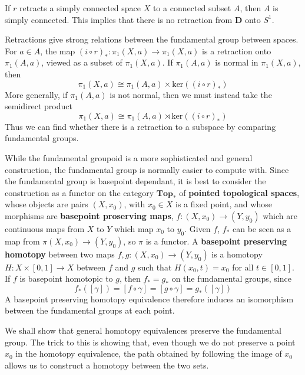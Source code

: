 \begin{example}
    If $r$ retracts a simply connected space $X$ to a connected subset $A$, then $A$ is simply connected. This implies that there is no retraction from $\mathbf{D}$ onto $S^1$.
\end{example}

Retractions give strong relations between the fundamental group between spaces. For $a \in A$, the map $(i \circ r)_*: \pi_1(X,a) \to \pi_1(X,a)$ is a retraction onto $\pi_1(A,a)$, viewed as a subset of $\pi_1(X,a)$. If $\pi_1(A,a)$ is normal in $\pi_1(X,a)$, then
%
\[ \pi_1(X,a) \cong \pi_1(A,a) \times \text{ker}((i \circ r)_*) \]
%
More generally, if $\pi_1(A,a)$ is not normal, then we must instead take the semidirect product
%
\[ \pi_1(X,a) \cong \pi_1(A,a) \rtimes \text{ker}((i \circ r)_*) \]
%
Thus we can find whether there is a retraction to a subspace by comparing fundamental groups.

While the fundamental groupoid is a more sophisticated and general construction, the fundamental group is normally easier to compute with. Since the fundamental group is basepoint dependant, it is best to consider the construction as a functor on the category $\textbf{Top}_*$ of {\bf pointed topological spaces}, whose objects are pairs $(X,x_0)$, with $x_0 \in X$ is a fixed point, and whose morphisms are {\bf basepoint proserving maps}, $f: (X,x_0) \to (Y,y_0)$ which are continuous maps from $X$ to $Y$ which map $x_0$ to $y_0$. Given $f$, $f_*$ can be seen as a map from $\pi(X,x_0) \to (Y,y_0)$, so $\pi$ is a functor. A {\bf basepoint preserving homotopy} between two maps $f,g: (X,x_0) \to (Y,y_0)$ is a homotopy $H: X \times [0,1] \to X$ between $f$ and $g$ such that $H(x_0, t) = x_0$ for all $t \in [0,1]$. If $f$ is basepoint homotopic to $g$, then $f_* = g_*$ on the fundamental groups, since
%
\[ f_*([\gamma]) = [f \circ \gamma] = [g \circ \gamma] = g_*([\gamma]) \]
%
A basepoint preserving homotopy equivalence therefore induces an isomorphism between the fundamental groups at each point.

We shall show that general homotopy equivalences preserve the fundamental group. The trick to this is showing that, even though we do not preserve a point $x_0$ in the homotopy equivalence, the path obtained by following the image of $x_0$ allows us to construct a homotopy between the two sets.


